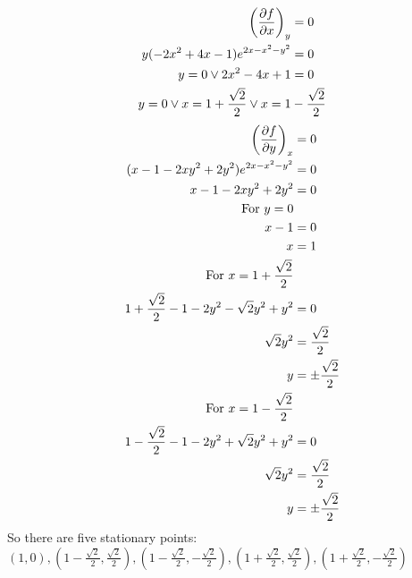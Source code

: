 \documentclass[10pt,\jkfside,a4paper]{article}
\begin{document}
\begin{enumerate}
\begin{enumerate}
\begin{equation}
\begin{split}
\left(\pdv{f}{x}\right)_y &= 0 \\
y(- 2x^{2} + 4x - 1)e^{2x - x^{2} - y^{2}} &= 0 \\
y = 0 \vee 2x^{2} - 4x + 1 &= 0 \\
y = 0 \vee x = 1 + \frac{\sqrt{2}}{2} \vee x = 1 &- \frac{\sqrt{2}}{2} \\
\end{split}
\end{equation}
\begin{equation}
\begin{split}
\left(\pdv{f}{y}\right)_x &= 0 \\
(x - 1 - 2xy^{2} + 2y^{2})e^{2x - x^{2} - y^{2}} &= 0 \\
x - 1 - 2xy^{2} + 2y^{2} &= 0 \\
\text{For } y = 0 \\
x - 1 &= 0 \\
x &= 1 \\
\text{For } x = 1 + \frac{\sqrt{2}}{2} \\
1 + \frac{\sqrt{2}}{2} - 1 - 2y^{2} - \sqrt{2}y^{2} + y^{2} &= 0 \\
\sqrt{2}y^{2} &= \frac{\sqrt{2}}{2} \\
y &= \pm \frac{\sqrt{2}}{2} \\
\text{For } x = 1 - \frac{\sqrt{2}}{2} \\
1 - \frac{\sqrt{2}}{2} - 1 - 2y^{2} + \sqrt{2}y^{2} + y^{2} &= 0 \\
\sqrt{2}y^{2} &= \frac{\sqrt{2}}{2} \\
y &= \pm \frac{\sqrt{2}}{2} \\
\end{split}
\end{equation}
So there are five stationary points:\\
$(1, 0), (1 - \frac{\sqrt{2}}{2}, \frac{\sqrt{2}}{2}), (1 - \frac{\sqrt{2}}{2}, - \frac{\sqrt{2}}{2}), (1 + \frac{\sqrt{2}}{2}, \frac{\sqrt{2}}{2}), (1 + \frac{\sqrt{2}}{2}, - \frac{\sqrt{2}}{2})$


\end{enumerate}
\end{enumerate}
\end{document}

